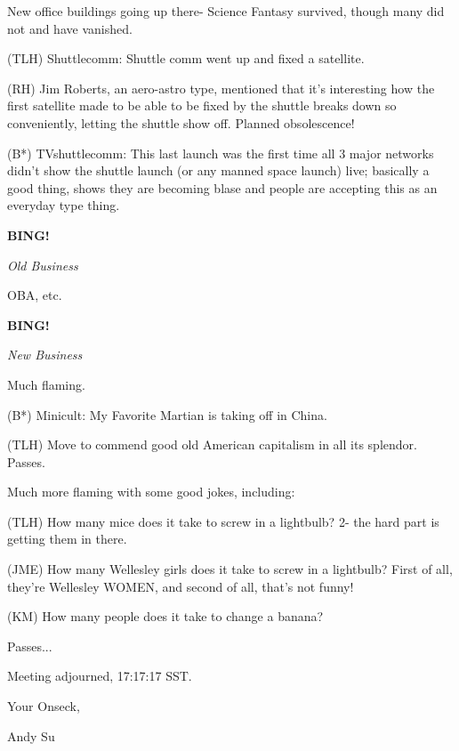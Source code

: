 \documentclass[12pt]{article}
\newcommand{\bing}{{\bf BING!} }
\newcommand{\goto}[1]{\bing \vskip 12pt \centerline{{\em{#1}}}}
\begin{document}
New office buildings going up there- Science Fantasy survived, though many did not and have vanished.

(TLH) Shuttlecomm: Shuttle comm went up and fixed a satellite.

(RH) Jim Roberts, an aero-astro type, mentioned that it's interesting how the first satellite made to be able to be fixed by the shuttle breaks down so conveniently, letting the shuttle show off. Planned obsolescence!

(B*) TVshuttlecomm: This last launch was the first time all 3 major networks didn't show the shuttle launch (or any manned space launch) live; basically a good thing, shows they are becoming blase and people are accepting this as an everyday type thing.

\goto{Old Business}

OBA, etc.

\goto{New Business}

Much flaming.

(B*) Minicult: My Favorite Martian is taking off in China.

(TLH) Move to commend good old American capitalism in all its splendor. Passes.

Much more flaming with some good jokes, including:

(TLH) How many mice does it take to screw in a lightbulb? 2- the hard part is getting them in there.

(JME) How many Wellesley girls does it take to screw in a lightbulb? First of all, they're Wellesley WOMEN, and second of all, that's not funny!

(KM) How many people does it take to change a banana?

Passes...

\vspace{12pt}

\noindent
Meeting adjourned, 17:17:17 SST.

\vspace{18pt}

\centerline{Your Onseck,}
\centerline{Andy Su}
\end{document}
